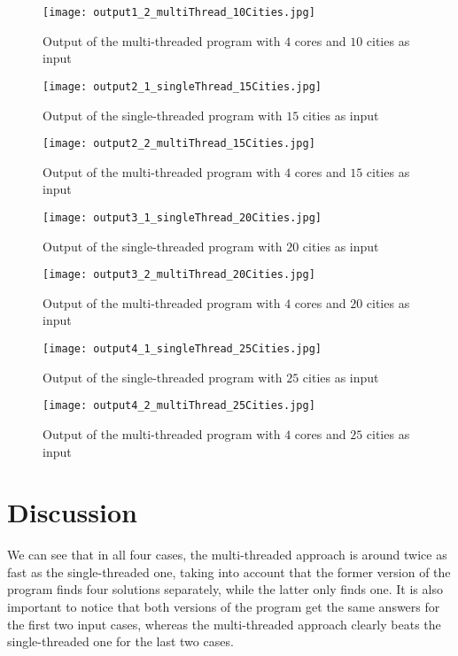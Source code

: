 \documentclass[twoside,twocolumn]{article}
\begin{document}
\begin{figure}[H]
\centering
\texttt{[image: output1\_2\_multiThread\_10Cities.jpg]}
\caption{Output of the multi-threaded program with $4$ cores and $10$ cities as input}
\end{figure} 

\begin{figure}[H]
\centering
\texttt{[image: output2\_1\_singleThread\_15Cities.jpg]}
\caption{Output of the single-threaded program with $15$ cities as input}
\end{figure} 

\begin{figure}[H]
\centering
\texttt{[image: output2\_2\_multiThread\_15Cities.jpg]}
\caption{Output of the multi-threaded program with $4$ cores and $15$ cities as input}
\end{figure}

\begin{figure}[H]
\centering
\texttt{[image: output3\_1\_singleThread\_20Cities.jpg]}
\caption{Output of the single-threaded program with $20$ cities as input}
\end{figure} 

\begin{figure}[H]
\centering
\texttt{[image: output3\_2\_multiThread\_20Cities.jpg]}
\caption{Output of the multi-threaded program with $4$ cores and $20$ cities as input}
\end{figure} 

\begin{figure}[H]
\centering
\texttt{[image: output4\_1\_singleThread\_25Cities.jpg]}
\caption{Output of the single-threaded program with $25$ cities as input}
\end{figure} 

\begin{figure}[H]
\centering
\texttt{[image: output4\_2\_multiThread\_25Cities.jpg]}
\caption{Output of the multi-threaded program with $4$ cores and $25$ cities as input}
\end{figure} 
  
  
\section{Discussion}
  
We can see that in all four cases, the multi-threaded approach is around twice as fast as the single-threaded one, taking into account that the former version of the program finds four solutions separately, while the latter only finds one. It is also important to notice that both versions of the program get the same answers for the first two input cases, whereas the multi-threaded approach clearly beats the single-threaded one for the last two cases. 
\end{document}
